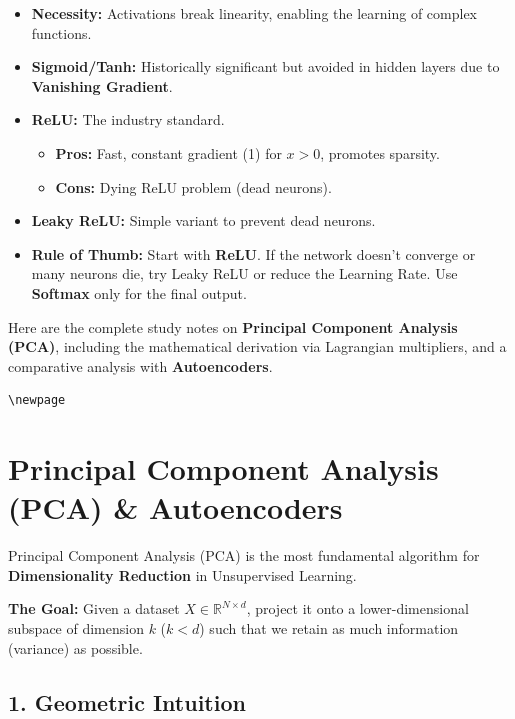 \documentclass[
  italian,
  11pt,
]{article}
\begin{document}
\begin{itemize}
\item
  \textbf{Necessity:} Activations break linearity, enabling the learning
  of complex functions.
\item
  \textbf{Sigmoid/Tanh:} Historically significant but avoided in hidden
  layers due to \textbf{Vanishing Gradient}.
\item
  \textbf{ReLU:} The industry standard.

  \begin{itemize}
  \item
    \textbf{Pros:} Fast, constant gradient (1) for \(x>0\), promotes
    sparsity.
  \item
    \textbf{Cons:} Dying ReLU problem (dead neurons).
  \end{itemize}
\item
  \textbf{Leaky ReLU:} Simple variant to prevent dead neurons.
\item
  \textbf{Rule of Thumb:} Start with \textbf{ReLU}. If the network
  doesn't converge or many neurons die, try Leaky ReLU or reduce the
  Learning Rate. Use \textbf{Softmax} only for the final output.
\end{itemize}

Here are the complete study notes on \textbf{Principal Component
Analysis (PCA)}, including the mathematical derivation via Lagrangian
multipliers, and a comparative analysis with \textbf{Autoencoders}.

\begin{verbatim}
\newpage
\end{verbatim}

\section{Principal Component Analysis (PCA) \&
Autoencoders}\label{principal-component-analysis-pca-autoencoders}

Principal Component Analysis (PCA) is the most fundamental algorithm for
\textbf{Dimensionality Reduction} in Unsupervised Learning.

\textbf{The Goal:} Given a dataset \(X \in \mathbb{R}^{N \times d}\),
project it onto a lower-dimensional subspace of dimension \(k\)
(\(k < d\)) such that we retain as much information (variance) as
possible.

\subsection{1. Geometric Intuition}\label{geometric-intuition-1}
\end{document}
